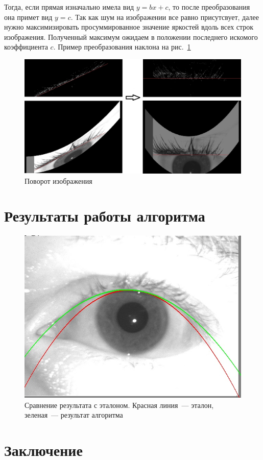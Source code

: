 \documentclass[12pt]{article} %
\begin{document}
Тогда, если прямая изначально имела вид $y=bx+c$, то после преобразования она примет вид $y = c$. Так как шум на изображении все равно присутсвует, далее нужно максимизировать просуммированное значение яркостей вдоль всех строк изображения. Полученный максимум ожидаем в положении последнего искомого коэффициента $c$. Пример преобразования наклона на рис.~\ref{fig:nakl}

\begin{figure}[h]
	
	\centering
	
	\includegraphics[width=0.8\linewidth]{nakl.jpg}
	
	\caption{Поворот изображения}
	
	\label{fig:nakl}
	
\end{figure}



\newpage
\section{Результаты работы алгоритма}


\begin{figure}[h]
	
	\centering
	
	\includegraphics[width=0.6\linewidth]{compare.jpg}
	
	\caption{Сравнение результата с эталоном. Красная линия~--- эталон, зеленая~--- результат алгоритма}
	
	\label{fig:compare}
	
\end{figure}




\newpage
\section{Заключение}




\newpage



\nocite{Yang}
\end{document}
